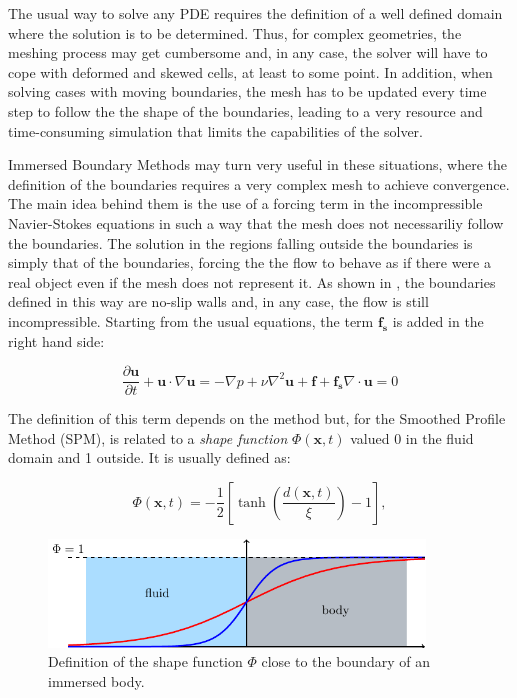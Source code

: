 The usual way to solve any PDE requires the definition of a well defined domain
where the solution is to be determined. Thus, for complex geometries, the
meshing process may get cumbersome and, in any case, the solver will have to
cope with deformed and skewed cells, at least to some point. In addition, when
solving cases with moving boundaries, the mesh has to be updated every time step
to follow the the shape of the boundaries, leading to a very resource and
time-consuming simulation that limits the capabilities of the solver.

Immersed Boundary Methods may turn very useful in these situations, where the
definition of the boundaries requires a very complex mesh to achieve
convergence. The main idea behind them is the use of a forcing term in the
incompressible Navier-Stokes equations in such a way that the mesh does not
necessariliy follow the boundaries. The solution in the regions falling outside
the boundaries is simply that of the boundaries, forcing the the flow to behave
as if there were a real object even if the mesh does not represent it. As shown
in \cite{LuoSPM}, the boundaries defined in this way are no-slip walls and, in
any case, the flow is still incompressible. Starting from the usual equations,
the term $\mathbf{f_s}$ is added in the right hand side:

\begin{subequations}
\begin{equation} \label{spm:eq:SPMeqmov}
    \frac{\partial\mathbf{u}}{\partial t} + \mathbf{u}\cdot\nabla\mathbf{u} =
        -\nabla p + \nu\nabla^2\mathbf{u} + \mathbf{f} + \mathbf{f_s}
\end{equation}
\begin{equation}
    \nabla\cdot\mathbf{u} = 0
\end{equation}
\end{subequations}

The definition of this term depends on the method but, for the Smoothed Profile
Method (SPM), is related to a \emph{shape function} $\Phi(\mathbf{x}, t)$ valued
0 in the fluid domain and 1 outside. It is usually defined as:

\begin{equation} \label{spm:eq:mask}
    \Phi(\mathbf{x}, t) = -\frac{1}{2} \left[ \tanh\left(\frac{d(\mathbf{x}, t)}
        {\xi}\right)-1 \right],
\end{equation}

\begin{figure}[htb]
    \centering
    \includegraphics[width=10cm]{img/concentration.pdf}
    \caption{Definition of the shape function $\Phi$ close to the boundary of
        an immersed body.}
    \label{spm:fig:shapefunc}
\end{figure}

